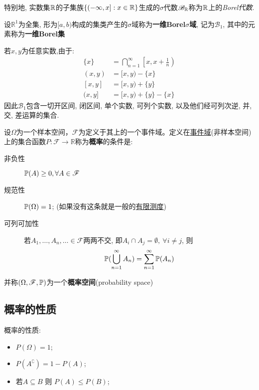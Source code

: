 特别地, 实数集$\R$的子集族$\{(-\infty,x] : x\in\R\}$生成的$\sigma$代数$\mathscr{B}_{\R}$称为$\R$上的\emph{Borel代数}.

\begin{definition}[Borel集]
    设$\mathbb{R}^1$为全集, 形为$[a,b)$构成的集类产生的$\sigma$域称为\textbf{一维Borel$\sigma$域}, 记为$\mathscr{B}_1$, 其中的元素称为\textbf{一维Borel集}
\end{definition}

若$x,y$为任意实数,由于:
\begin{align*}
    \{x\}  & =  \bigcap_{n=1}^{\infty}\left[x, x+\frac{1}{n}\right) \\
    (x, y) & =  [x, y)-\{x\}                                        \\
    [x, y] & =  [x, y)+\{y\}                                        \\
    (x, y] & =  [x, y)+\{y\}-\{x\}
\end{align*}
因此$\mathscr{B}_1$包含一切开区间, 闭区间, 单个实数, 可列个实数, 以及他们经可列次逆, 并, 交, 差运算的集合.

\begin{definition}[概率空间]
    设$\Omega$为一个样本空间，$\mathscr{F}$为定义于其上的一个事件域。定义在\underline{事件域}(非样本空间)上的集合函数$P : \mathscr{F} \to \mathbb{R}$称为\textbf{概率}的条件是:
    \begin{description}
        \item[非负性] $\P(A)\ge 0 , \forall A \in \mathscr{F}$
        \item[规范性] $\P(\Omega) = 1$; (如果没有这条就是一般的\underline{有限测度})
        \item[可列可加性] 若$A_{1},\dots,A_{n},\ldots \in \mathscr{F}$两两不交, 即$A_{i}\cap A_{j} = \emptyset, \ \forall i\neq j$, 则
        \[ \P(\bigcup_{n=1}^{\infty}A_{n}) = \sum_{n=1}^{\infty}\P(A_{n}) \]
    \end{description}
    并称$(\Omega,\mathscr{F},\P)$为一个\textbf{概率空间}(probability space)
\end{definition}

\subsection{概率的性质}

\begin{property}
    概率的性质:
    \begin{itemize}
        \item $P(\Omega)=1$;
        \item $P(A^{\complement})=1-P(A)$;
        \item 若$A \subseteq B $ 则 $P(A)\le P(B)$;
    \end{itemize}
\end{property}

